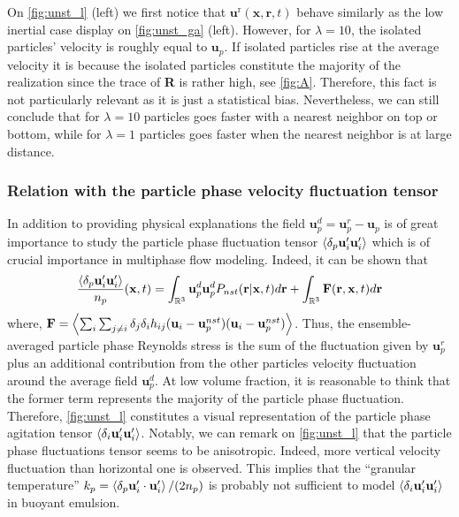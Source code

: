 On \ref{fig:unst_l} (left) we first notice that $\textbf{u}^\text{r}(\textbf{x},\textbf{r},t)$ behave similarly as the low inertial case display on \ref{fig:unst_ga} (left).
However, for $\lambda = 10$, the isolated particles' velocity is roughly equal to $\textbf{u}_p$. 
If isolated particles rise at the average velocity it is because the isolated particles constitute the majority of the realization since the trace of \textbf{R} is rather high, see \ref{fig:A}.
Therefore, this fact is not particularly relevant as it is just a statistical bias. 
Nevertheless, we can still conclude that for $\lambda = 10$ particles goes faster with a nearest neighbor on top or bottom, while for  $\lambda = 1$ particles goes faster when the nearest neighbor is at large distance. 

\subsubsection{Relation with the particle phase velocity fluctuation tensor}

In addition to providing physical explanations the field $\textbf{u}_p^d = \textbf{u}^r_p - \textbf{u}_p$ is of great importance to study the particle phase fluctuation tensor $\left<\delta_p \textbf{u}_i' \textbf{u}_i'\right>$ which is of crucial importance in multiphase flow modeling. 
Indeed, it can be shown that 
\begin{equation}
    \frac{\pavg{ \textbf{u}_i' \textbf{u}_i'}}{n_p}(\textbf{x},t)
    =  
    \int_{\mathbb{R}^3 }
    \textbf{u}_p^d
    \textbf{u}_p^d
    P_{nst}(\textbf{r}|\textbf{x},t)
    d\textbf{r}
    + \int_{\mathbb{R}^3 }
    \textbf{F}(\textbf{r},\textbf{x},t)
    d\textbf{r}
    \label{eq:particle_center_of_mass_velocities}
\end{equation}
where, $\textbf{F} = \left<\sum_i\sum_{j\neq i}\delta_j\delta_i h_{ij}(\textbf{u}_i - \textbf{u}_p^{nst})(\textbf{u}_i - \textbf{u}_p^{nst})\right>$. 
Thus, the ensemble-averaged particle phase Reynolds stress is the sum of the fluctuation given by $\textbf{u}_p^r$ plus an additional contribution from the other particles velocity fluctuation around the average field $\textbf{u}_p^d$. 
At low volume fraction, it is reasonable to think that the former term represents the majority of the particle phase fluctuation. 
Therefore, \ref{fig:unst_l} constitutes a visual representation of the particle phase agitation tensor $\left<\delta_i \textbf{u}_i' \textbf{u}_i'\right>$. 
Notably, we can remark on \ref{fig:unst_l}  that the particle phase fluctuations tensor seems to be anisotropic. 
Indeed, more vertical velocity fluctuation than horizontal one is observed. 
This implies that the ``granular temperature'' $k_p = \left<\delta_p  \textbf{u}_i' \cdot \textbf{u}_i'\right>/(2n_p)$ is probably not sufficient to model $\left<\delta_i \textbf{u}_i' \textbf{u}_i'\right>$ in buoyant emulsion. 

